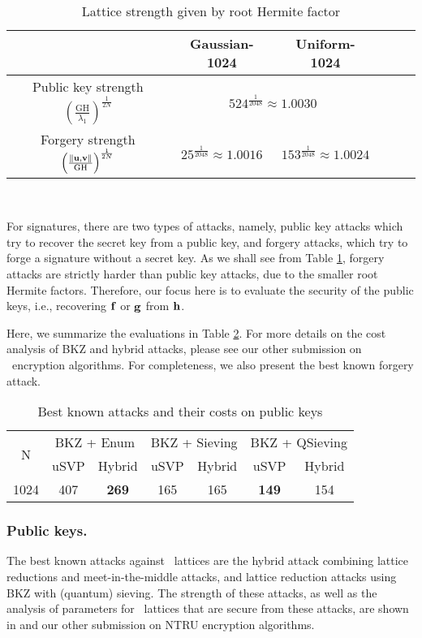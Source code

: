 \documentclass{llncs}
\newcommand{\bff}{{\bf f}}
\newcommand{\bfg}{{\bf g}}
\newcommand{\bfh}{{\bf h}}
\newcommand{\bfu}{{\bf u}}
\newcommand{\bfv}{{\bf v}}
\newcommand{\ntru}{{\sf{NTRU}}}
\newcommand{\<}{\langle}
\renewcommand{\>}{\rangle}
\begin{document}
\begin{table}\centering\caption{Lattice strength given by root Hermite factor}
\begin{tabular}{|c|c|c|c|c|c|}\hline
& \textsf{Gaussian-1024} &
\textsf{Uniform-1024} 
\\\hline
Public key strength $\left(\frac{\text{GH}}{\lambda_1}\right)^\frac{1}{2N}$ &   \multicolumn{2}{c|}{$524^\frac{1}{2048}\approx 1.0030$} \\\hline
Forgery strength  $\left(\frac{\|\bfu,\bfv\|}{\text{GH}}\right)^\frac{1}{2N}$ & $25^\frac{1}{2048}\approx 1.0016$ & $153^\frac{1}{2048}\approx 1.0024$\\\hline%

\end{tabular} \\\label{tab:rhf}

\end{table}
For signatures, there are two types of attacks, namely,
public key attacks which try to recover the secret key
from a public key, and forgery attacks, which try to 
forge a signature without a secret key.
As we shall see from Table 
\ref{tab:rhf}, forgery attacks are strictly harder than
public key attacks, due to the smaller root Hermite factors. 
Therefore, our focus here is to evaluate the security
of the public keys, i.e., recovering $\bff$ or $\bfg$ from
$\bfh$.

Here, we summarize the evaluations in Table \ref{tbl:cost}.
For more details on the cost analysis of BKZ and hybrid
attacks, please see our other submission on \ntru~encryption
algorithms. For completeness, we also present the best known forgery
attack.
\begin{table}
\centering
\caption{Best known attacks and their costs on public keys}
\label{tbl:cost}
\begin{tabular}{|c|c|c|c|c|c|c|}\hline
\multirow{2}{*}{N}  &\multicolumn{2}{|c|}{BKZ + Enum}& \multicolumn{2}{|c|}{BKZ + Sieving}& \multicolumn{2}{|c|}{BKZ + QSieving}\\
\cline{2-7}
 &uSVP & Hybrid&uSVP & Hybrid&uSVP & Hybrid\\\hline\hline
1024 & 407 & {\bf 269} & 165 & 165 & {\bf 149} & 154\\\hline

\end{tabular}
\end{table}



\subsubsection{Public keys.}
The best known attacks against \ntru~lattices are the hybrid attack
\cite{Howgrave-Graham2007}  
combining lattice reductions and meet-in-the-middle attacks,
and lattice reduction attacks using BKZ with (quantum) sieving.
The strength of these attacks, as well as the analysis of parameters for \ntru~lattices that are 
secure from these attacks, are shown in \cite{DBLP:conf/ctrsa/HoffsteinPSSWZ17} and our other submission on NTRU encryption
algorithms.
\end{document}
